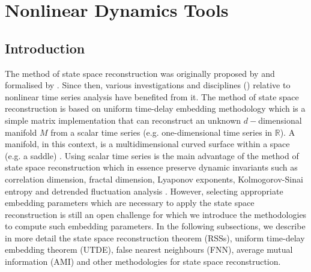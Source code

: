 

%
\graphicspath{{figs/chapter4/PDF/}}





\chapter{Nonlinear Dynamics Tools}

\section{Introduction}
The method of state space reconstruction was originally proposed by \cite{packard1980} 
and formalised by \cite{takens1981}. Since then, various investigations and disciplines 
(\cite{aguirre2009, stergiou2011, frank2010, sama2013}) 
relative to nonlinear time series analysis have benefited from it.
The method of state space reconstruction is based on uniform time-delay embedding methodology 
which is a simple matrix implementation that can reconstruct 
an unknown $d-$dimensional manifold $M$ from a scalar time series 
(e.g. one-dimensional time series in $\mathbb{R}$).
A manifold, in this context, is a multidimensional curved surface within a space (e.g. a saddle) 
\cite{guastello-gregson2011}.
Using scalar time series is the main advantage of the method of state space reconstruction 
which in essence preserve dynamic invariants such as correlation dimension, 
fractal dimension, Lyaponov exponents, Kolmogorov-Sinai entropy and detrended 
fluctuation analysis \cite{bradley2015, Quintana-Duque2012, Quintana-Duque2013, 
Quintana-Duque2016, krakovska2015}.
However, selecting appropriate embedding parameters which are necessary to apply 
the state space reconstruction is still an open challenge for which 
we introduce the methodologies to compute such embedding parameters.
In the following subsections, we describe in more detail the state space reconstruction 
theorem (RSSs), uniform time-delay embedding theorem (UTDE),
false nearest neighbours (FNN), average mutual information (AMI) and other 
methodologies for state space reconstruction.




